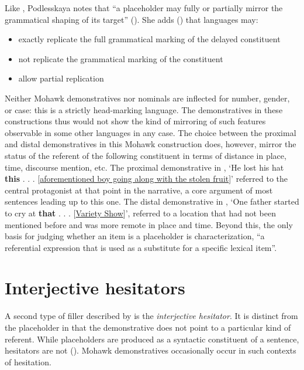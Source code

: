 \documentclass[output=paper]{langscibook}
\begin{document}
Like \citet{HayashiYoon2006}, Podlesskaya notes that “a placeholder may fully or partially mirror the grammatical shaping of its target” (\citeyear[11]{Podlesskaya2010}). She adds (\citeyear[18]{Podlesskaya2010}) that languages may:

\begin{itemize}
\item exactly replicate the full grammatical marking of the delayed constituent
\item not replicate the grammatical marking of the constituent
\item allow partial replication
\end{itemize}

Neither Mohawk demonstratives nor nominals are inflected for number, gender, or case: this is a strictly head-marking language. The demonstratives in these constructions thus would not show the kind of mirroring of such features observable in some other languages in any case. The choice between the proximal and distal demonstratives in this Mohawk construction does, however, mirror the status of the referent of the following constituent in terms of distance in place, time, discourse mention, etc. The proximal demonstrative in , ‘He lost his hat \textbf{this} . . . [\uline{aforementioned boy going along with the stolen fruit}]’ referred to the central protagonist at that point in the narrative, a core argument of most sentences leading up to this one. The distal demonstrative in , ‘One father started to cry at \textbf{that} . . . [\uline{Variety Show}]’, referred to a location that had not been mentioned before and was more remote in place and time. Beyond this, the only basis for judging whether an item is a placeholder is  characterization, “a referential expression that is used as a substitute for a specific lexical item”.


\section{Interjective hesitators}
\label{sec:mithun:5}

A second type of filler described by \citet{HayashiYoon2006} is the \textit{interjective hesitator}. It is distinct from the placeholder in that the demonstrative does not point to a particular kind of referent. While placeholders are produced as a syntactic constituent of a sentence, hesitators are not (\citeyear[489]{HayashiYoon2006}). Mohawk demonstratives occasionally occur in such contexts of hesitation.
\end{document}
